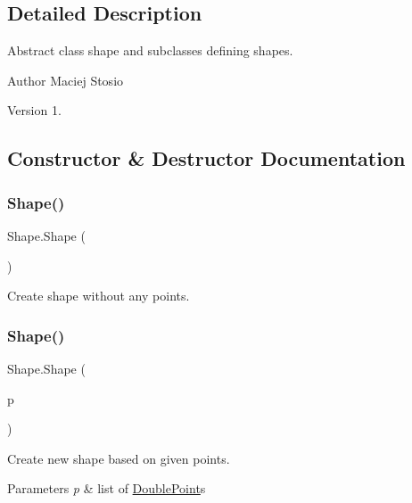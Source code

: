 \subsection{Detailed Description}
Abstract class shape and subclasses defining shapes. \begin{DoxyAuthor}{Author}
Maciej Stosio 
\end{DoxyAuthor}
\begin{DoxyVersion}{Version}
1. 
\end{DoxyVersion}


\subsection{Constructor \& Destructor Documentation}
\mbox{\label{class_shape_a3d76b5d801383515923d2f9f800d0d6c}} 
\subsubsection{\texorpdfstring{Shape()}{Shape()}\hspace{0.1cm}{\footnotesize\ttfamily [1/2]}}
{\footnotesize\ttfamily Shape.\+Shape (\begin{DoxyParamCaption}{ }\end{DoxyParamCaption})}

Create shape without any points. \mbox{\label{class_shape_a077daea39f5e67150f6ca1b89b6fc6fd}} 
\subsubsection{\texorpdfstring{Shape()}{Shape()}\hspace{0.1cm}{\footnotesize\ttfamily [2/2]}}
{\footnotesize\ttfamily Shape.\+Shape (\begin{DoxyParamCaption}\item[{Array\+List$<$ \hyperlink{class_double_point}{Double\+Point} $>$}]{p }\end{DoxyParamCaption})}

Create new shape based on given points. 
\begin{DoxyParams}{Parameters}
{\em p} & list of \hyperlink{class_double_point}{Double\+Point}\textquotesingle{}s \\
\hline
\end{DoxyParams}



